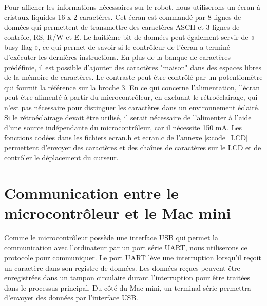 Pour afficher les informations nécessaires sur le robot, nous utiliserons un écran à cristaux liquides 16 x 2  caractères. Cet écran est commandé par 8 lignes de données qui permettent de transmettre des caractères ASCII et 3 lignes de contrôle, RS, R/W et E. Le huitième bit de données peut également servir de « busy flag », ce qui permet de savoir si le contrôleur de l'écran a terminé d'exécuter les dernières instructions. En plus de la banque de caractères prédéfinie, il est possible d'ajouter des caractères "maison" dans des espaces libres de la mémoire de caractères. Le contraste peut être contrôlé par un potentiomètre qui fournit la référence sur la broche 3. En ce qui concerne l'alimentation, l'écran peut être alimenté à partir du microcontrôleur, en excluant le rétroéclairage, qui n'est pas nécessaire pour distinguer les caractères dans un environnement éclairé. Si le rétroéclairage devait être utilisé, il serait nécessaire de l'alimenter à l'aide d'une source indépendante du microcontrôleur, car il nécessite 150 mA. Les fonctions codées dans les fichiers ecran.h et ecran.c de l'annexe \ref{s:code_LCD} permettent d'envoyer des caractères et des chaînes de caractères sur le LCD et de contrôler le déplacement du curseur.

\section{Communication entre le microcontrôleur et le Mac mini} \label{s:comm_mac_micro}

Comme le microcontrôleur possède une interface USB qui permet la communication avec l'ordinateur par un port série UART, nous utiliserons ce protocole pour communiquer. Le port UART lève une interruption lorsqu'il reçoit un caractère dans son registre de données. Les données reçues peuvent être enregistrées dans un tampon circulaire durant l'interruption pour être traitées dans le processus principal. Du côté du Mac mini, un terminal série permettra d'envoyer des données par l'interface USB. 

